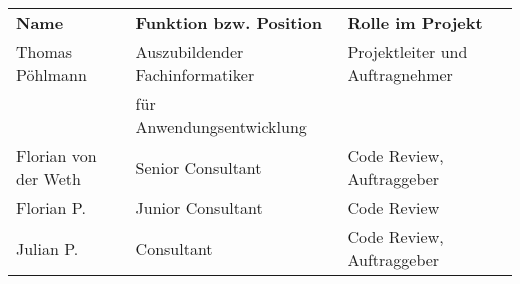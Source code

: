 \begin{tabu}{lll}
\rowfont{\bfseries\leavevmode\color{headingfont}}\textbf{Name} & \textbf{Funktion bzw. Position} & \textbf{Rolle im Projekt} \\
Thomas Pöhlmann & Auszubildender Fachinformatiker & Projektleiter und Auftragnehmer \\
& für Anwendungsentwicklung & \\
Florian von der Weth & Senior Consultant & Code Review, Auftraggeber \\
Florian P. & Junior Consultant & Code Review \\
Julian P. & Consultant & Code Review, Auftraggeber \\
\end{tabu}